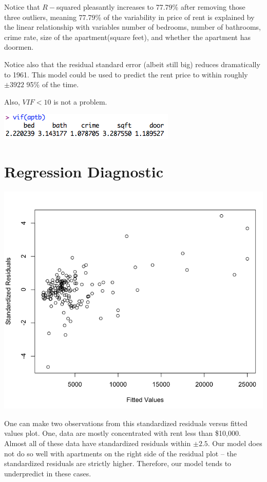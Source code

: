\documentclass[a4 paper, 11 pt, twocolumn]{article}
\begin{document}
Notice that $R-$squared pleasantly increases to 77.79\% after removing those three outliers, meaning 77.79\% of the variability in price of rent is explained by the linear relationship with variables number of bedrooms, number of bathrooms, crime rate, size of the apartment(square feet), and whether the apartment has doormen.

Notice also that the residual standard error (albeit still big) reduces dramatically to 1961. This model could be used to predict the rent price to within roughly $\pm 3922$ 95\% of the time.

Also, $VIF<10$ is not a problem.
\begin{center}
\includegraphics[scale=0.6]{vif2}
\end{center}

\section{Regression Diagnostic}
\begin{center}
\includegraphics[scale=0.3]{residual2}
\end{center}
One can make two observations from this standardized residuals versus fitted values plot. One, data are mostly concentrated with rent less than \$10,000. Almost all of these data have standardized residuals within $\pm 2.5$. Our model does not do so well with apartments on the right side of the residual plot -- the standardized residuals are strictly higher. Therefore, our model tends to underpredict in these cases.
\end{document}

